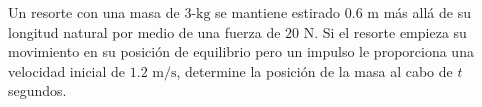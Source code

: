 \item Un resorte con una masa de $3\text{-kg}$ se mantiene estirado $0.6 \text{ m}$ más allá de su longitud natural por medio de una fuerza de $20 \text{ N}$. Si el resorte empieza su movimiento en su posición de equilibrio pero un impulso le proporciona una velocidad inicial de $1.2 \text{ m/s}$, determine la posición de la masa al cabo de $t$ segundos.
